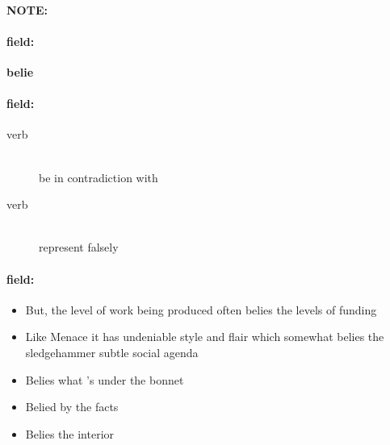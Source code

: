 \documentclass[12pt]{article}
\newenvironment{note}{\paragraph{NOTE:}}{}
\newenvironment{field}{\paragraph{field:}}{}
\begin{document}
\begin{note}
\begin{field}
\textbf{\large belie}
\end{field}


\begin{field}
\begin{description}
\item[verb] \hfill \\ 
be in contradiction with

\item[verb] \hfill \\ 
represent falsely

\end{description}
\end{field}

\begin{field}
\begin{itemize}
\item But, the level of work being produced often belies the levels of funding
\item Like Menace it has undeniable style and flair which somewhat belies the sledgehammer subtle social agenda
\item Belies what 's under the bonnet
\item Belied by the facts
\item Belies the interior
\end{itemize}
\end{field}
\end{note}
\end{document}
